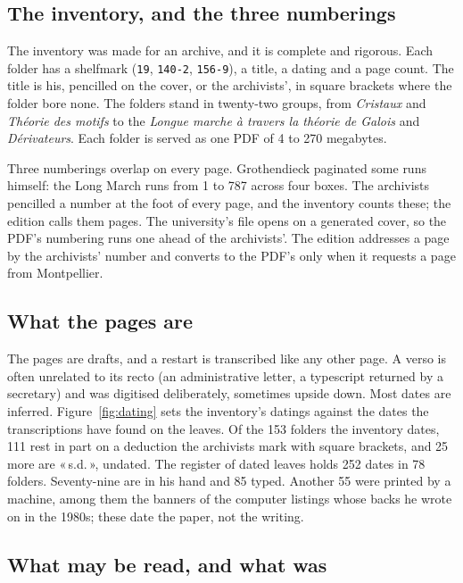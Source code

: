 \documentclass[11pt]{article}
\newcommand{\q}[1]{«\,#1\,»}
\begin{document}
\subsection{The inventory, and the three numberings}

The inventory was made for an archive, and it is complete and rigorous. Each folder has a shelfmark (\texttt{19}, \texttt{140-2}, \texttt{156-9}), a title, a dating and a page count. The title is his, pencilled on the cover, or the archivists', in square brackets where the folder bore none. The folders stand in twenty-two groups, from \emph{Cristaux} and \emph{Théorie des motifs} to the \emph{Longue marche à travers la théorie de Galois} and \emph{Dérivateurs}. Each folder is served as one PDF of 4 to 270 megabytes.

Three numberings overlap on every page. Grothendieck paginated some runs himself: the Long March runs from 1 to 787 across four boxes. The archivists pencilled a number at the foot of every page, and the inventory counts these; the edition calls them pages. The university's file opens on a generated cover, so the PDF's numbering runs one ahead of the archivists'. The edition addresses a page by the archivists' number and converts to the PDF's only when it requests a page from Montpellier.

\subsection{What the pages are}

The pages are drafts, and a restart is transcribed like any other page. A verso is often unrelated to its recto (an administrative letter, a typescript returned by a secretary) and was digitised deliberately, sometimes upside down. Most dates are inferred. Figure~\ref{fig:dating} sets the inventory's datings against the dates the transcriptions have found on the leaves. Of the 153 folders the inventory dates, 111 rest in part on a deduction the archivists mark with square brackets, and 25 more are \q{s.d.}, undated. The register of dated leaves holds 252 dates in 78 folders. Seventy-nine are in his hand and 85 typed. Another 55 were printed by a machine, among them the banners of the computer listings whose backs he wrote on in the 1980s; these date the paper, not the writing.



\subsection{What may be read, and what was}
\end{document}
